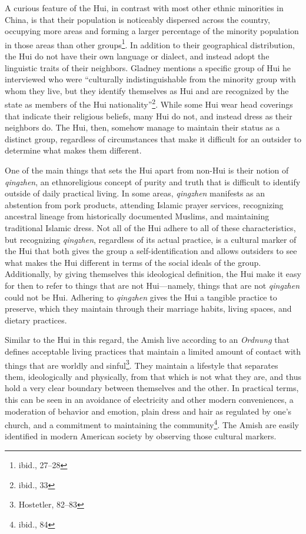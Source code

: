 A curious feature of the Hui, in contrast with most other ethnic minorities in
China, is that their population is noticeably dispersed across the country,
occupying more areas and forming a larger percentage of the minority population
in those areas than other groups\footnote{ibid., 27--28}. In addition to their
geographical distribution, the Hui do not have their own language or dialect,
and instead adopt the linguistic traits of their neighbors. Gladney mentions a
specific group of Hui he interviewed who were ``culturally indistinguishable
from the minority group with whom they live, but they identify themselves as Hui
and are recognized by the state as members of the Hui
nationality''\footnote{ibid., 33}. While some Hui wear head coverings that
indicate their religious beliefs, many Hui do not, and instead dress as their
neighbors do. The Hui, then, somehow manage to maintain their status as a
distinct group, regardless of circumstances that make it difficult for an
outsider to determine what makes them different.

One of the main things that sets the Hui apart from non-Hui is their notion of
\textit{qingzhen}, an ethnoreligious concept of purity and truth that is
difficult to identify outside of daily practical living. In some areas,
\textit{qingzhen} manifests as an abstention from pork products, attending
Islamic prayer services, recognizing ancestral lineage from historically
documented Muslims, and maintaining traditional Islamic dress. Not all of the
Hui adhere to all of these characteristics, but recognizing \textit{qingzhen},
regardless of its actual practice, is a cultural marker of the Hui that both
gives the group a self-identification and allows outsiders to see what makes the
Hui different in terms of the social ideals of the group. Additionally, by
giving themselves this ideological definition, the Hui make it easy for then to
refer to things that are not Hui---namely, things that are not \textit{qingzhen}
could not be Hui. Adhering to \textit{qingzhen} gives the Hui a tangible
practice to preserve, which they maintain through their marriage habits, living
spaces, and dietary practices.

Similar to the Hui in this regard, the Amish live according to an
\textit{Ordnung} that defines acceptable living practices that maintain a
limited amount of contact with things that are worldly and
sinful\footnote{Hostetler, 82--83}. They maintain a lifestyle that separates
them, ideologically and physically, from that which is not what they are, and
thus hold a very clear boundary between themselves and the other. In practical
terms, this can be seen in an avoidance of electricity and other modern
conveniences, a moderation of behavior and emotion, plain dress and hair as
regulated by one's church, and a commitment to maintaining the
community\footnote{ibid., 84}.  The Amish are easily identified in modern
American society by observing those cultural markers.


